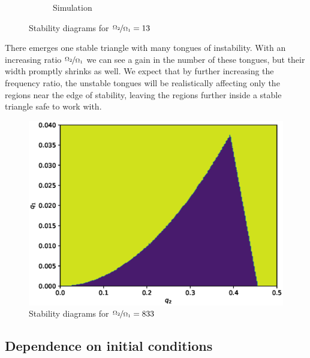 \begin{figure}[H]
\begin{subfigure}{.5\textwidth}
  \caption{Simulation}
  \label{fig:sim_13}
\end{subfigure}
\caption{Stability diagrams for $\nicefrac{\Omega_2}{\Omega_1} = 13$}
\label{fig:stabil-eta=13}
\end{figure}

There emerges one stable triangle with many tongues of instability. With an increasing ratio $\nicefrac{\Omega_2}{\Omega_1}$ we can see a gain in the number of these tongues, but their width promptly shrinks as well. We expect that by further increasing the frequency ratio, the unstable tongues will be realistically affecting only the regions near the edge of stability, leaving the regions further inside a stable triangle safe to work with.


\begin{figure}[H]
	\centering
	\includegraphics[width=\linewidth]{img/0_ions_1_electrons_q1_0.0-0.04_q2_0.0-0.5_240x240_833.eps}
	\caption{Stability diagrams for $\nicefrac{\Omega_2}{\Omega_1} = 833$}
	\label{fig:stabil-eta=833}
\end{figure}

\subsection{Dependence on initial conditions}


